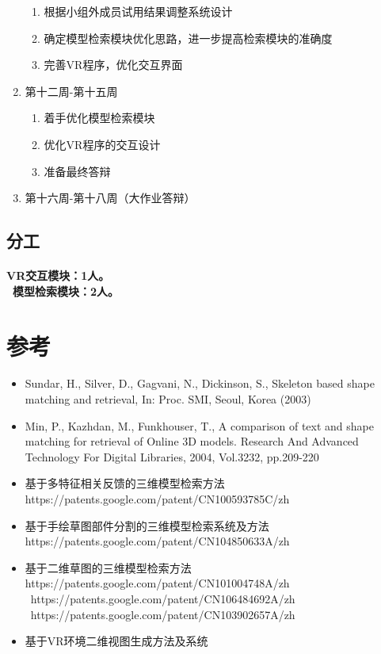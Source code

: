 \documentclass{article}
\begin{document}
\begin{enumerate}
\begin{enumerate}
        \item 根据小组外成员试用结果调整系统设计
        \item 确定模型检索模块优化思路，进一步提高检索模块的准确度
        \item 完善VR程序，优化交互界面
    \end{enumerate}
    \item 第十二周-第十五周
    \begin{enumerate}
        \item 着手优化模型检索模块
        \item 优化VR程序的交互设计
        \item 准备最终答辩
    \end{enumerate}
    \item 第十六周-第十八周（大作业答辩）
\end{enumerate}
\subsection{分工}
\paragraph{VR交互模块：1人。 \\\ 模型检索模块：2人。
}

\section{参考}
\begin{itemize}
    \item Sundar, H., Silver, D., Gagvani, N., Dickinson, S., Skeleton based shape matching and retrieval, In: Proc. SMI, Seoul, Korea (2003)
    \item Min, P., Kazhdan, M., Funkhouser, T., A comparison of text and shape matching for retrieval of Online 3D models. Research And Advanced Technology For Digital Libraries, 2004, Vol.3232, pp.209-220
    \item 基于多特征相关反馈的三维模型检索方法 https://patents.google.com/patent/CN100593785C/zh
    \item 基于手绘草图部件分割的三维模型检索系统及方法 https://patents.google.com/patent/CN104850633A/zh
    \item 基于二维草图的三维模型检索方法 https://patents.google.com/patent/CN101004748A/zh \\\ https://patents.google.com/patent/CN106484692A/zh \\\ https://patents.google.com/patent/CN103902657A/zh
    \item 基于VR环境二维视图生成方法及系统

\end{itemize}
\end{document}
